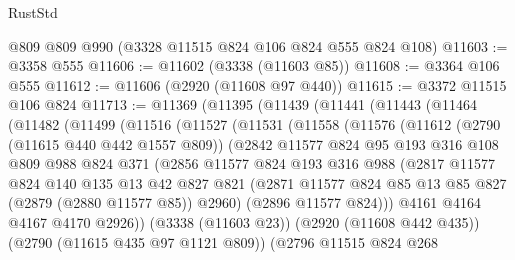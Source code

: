\begin{lexlean}{RustStd}
\begin{coremodule}
    @809
    @809
    @990
    (@3328 @11515 @824 @106 @824 @555 @824 @108)
@11603 := @3358 @555
@11606 := @11602 (@3338 (@11603 @85))
@11608 := @3364 @106 @555
@11612 := @11606 (@2920 (@11608 @97 @440))
@11615 := @3372 @11515 @106 @824
@11713 := @11369
    (@11395
      (@11439
        (@11441
          (@11443
            (@11464
              (@11482
                (@11499
                  (@11516
                    (@11527
                      (@11531
                        (@11558
                          (@11576
                            (@11612
                              (@2790 (@11615 @440 @442 @1557 @809))
                              (@2842
                                @11577
                                @824
                                @95
                                @193
                                @316
                                @108
                                @809
                                @988
                                @824
                                @371
                                (@2856
                                  @11577
                                  @824
                                  @193
                                  @316
                                  @988
                                  (@2817
                                    @11577
                                    @824
                                    @140
                                    @135
                                    @13
                                    @42
                                    @827
                                    @821
                                    (@2871
                                      @11577
                                      @824
                                      @85
                                      @13
                                      @85
                                      @827
                                      (@2879 (@2880 @11577 @85))
                                      @2960)
                                    (@2896 @11577 @824)))
                                @4161
                                @4164
                                @4167
                                @4170
                                @2926))
                            (@3338 (@11603 @23))
                            (@2920 (@11608 @442 @435))
                            (@2790 (@11615 @435 @97 @1121 @809))
                            (@2796
                              @11515
                              @824
                              @268

\end{coremodule}
\end{lexlean}
